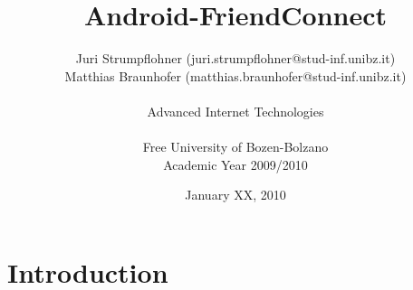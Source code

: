 \documentclass[a4paper,oneside]{article}
\begin{document}
\title{Android-FriendConnect}
\author{\small{Juri Strumpflohner (juri.strumpflohner@stud-inf.unibz.it)} \\
\small{Matthias Braunhofer (matthias.braunhofer@stud-inf.unibz.it)} \\ \\
\small{Advanced Internet Technologies} \\ \\ 
\small{Free University of Bozen-Bolzano} \\ \small{Academic Year 2009/2010}}

\date{January XX, 2010}

\maketitle

\pagebreak

\section{Introduction}
\end{document}
